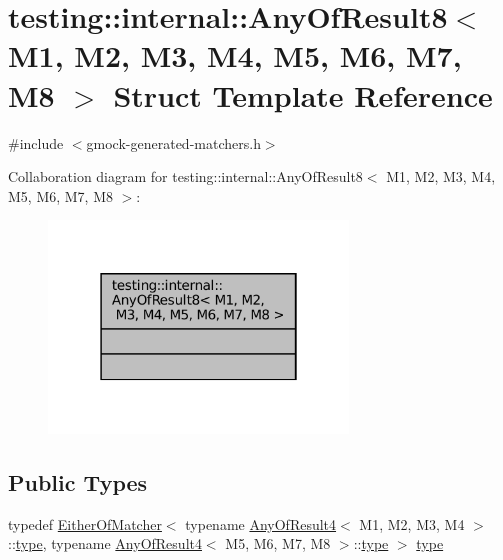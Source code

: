 \hypertarget{structtesting_1_1internal_1_1AnyOfResult8}{}\section{testing\+:\+:internal\+:\+:Any\+Of\+Result8$<$ M1, M2, M3, M4, M5, M6, M7, M8 $>$ Struct Template Reference}
\label{structtesting_1_1internal_1_1AnyOfResult8}


{\ttfamily \#include $<$gmock-\/generated-\/matchers.\+h$>$}



Collaboration diagram for testing\+:\+:internal\+:\+:Any\+Of\+Result8$<$ M1, M2, M3, M4, M5, M6, M7, M8 $>$\+:
\nopagebreak
\begin{figure}[H]
\begin{center}
\leavevmode
\includegraphics[width=226pt]{structtesting_1_1internal_1_1AnyOfResult8__coll__graph}
\end{center}
\end{figure}
\subsection*{Public Types}
\begin{DoxyCompactItemize}
\item 
typedef \hyperlink{classtesting_1_1internal_1_1EitherOfMatcher}{Either\+Of\+Matcher}$<$ typename \hyperlink{structtesting_1_1internal_1_1AnyOfResult4}{Any\+Of\+Result4}$<$ M1, M2, M3, M4 $>$\+::\hyperlink{structtesting_1_1internal_1_1AnyOfResult8_a8f8a1e78a019965c24bd22c78885747d}{type}, typename \hyperlink{structtesting_1_1internal_1_1AnyOfResult4}{Any\+Of\+Result4}$<$ M5, M6, M7, M8 $>$\+::\hyperlink{structtesting_1_1internal_1_1AnyOfResult8_a8f8a1e78a019965c24bd22c78885747d}{type} $>$ \hyperlink{structtesting_1_1internal_1_1AnyOfResult8_a8f8a1e78a019965c24bd22c78885747d}{type}
\end{DoxyCompactItemize}


